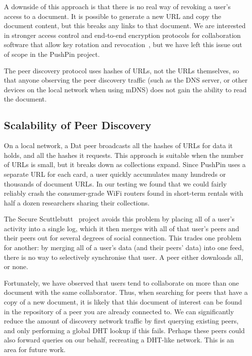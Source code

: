 \documentclass[sigplan,10pt]{acmart}
\begin{document}
A downside of this approach is that there is no real way of revoking a user's access to a document.
It is possible to generate a new URL and copy the document content, but this breaks any links to that document.
We are interested in stronger access control and end-to-end encryption protocols for collaboration software that allow key rotation and revocation~\cite{Kleppmann:2018tk}, but we have left this issue out of scope in the PushPin project.

The peer discovery protocol uses hashes of URLs, not the URLs themselves, so that anyone observing the peer discovery traffic (such as the DNS server, or other devices on the local network when using mDNS) does not gain the ability to read the document.

\subsection{Scalability of Peer Discovery}


On a local network, a Dat peer broadcasts all the hashes of URLs for data it holds, and all the hashes it requests.
This approach is suitable when the number of URLs is small, but it breaks down as collections expand.
Since PushPin uses a separate URL for each card, a user quickly accumulates many hundreds or thousands of document URLs.
In our testing we found that we could fairly reliably crash the consumer-grade WiFi routers found in short-term rentals with half a dozen researchers sharing their collections.


The Secure Scuttlebutt~\cite{Tarr:2019ba} project avoids this problem by placing all of a user's activity into a single log, which it then merges with all of that user's peers and their peers out for several degrees of social connection. This trades one problem for another: by merging all of a user's data (and their peers' data) into one feed, there is no way to selectively synchronise that user. A peer either downloads all, or none.

Fortunately, we have observed that users tend to collaborate on more than one document with the same collaborator.
Thus, when searching for peers that have a copy of a new document, it is likely that this document of interest can be found in the repository of a peer you are already connected to.
We can significantly reduce the amount of discovery network traffic by first querying existing peers, and only performing a global DHT lookup if this fails.
Perhaps these peers could also forward queries on our behalf, recreating a DHT-like network.
This is an area for future work.
\end{document}
